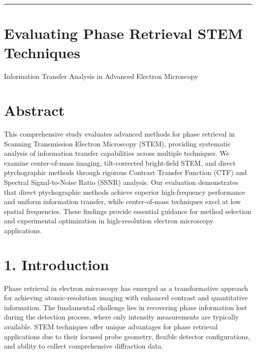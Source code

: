 \documentclass[
  letterpaper,
]{book}
\begin{document}
\begin{center}\rule{0.5\linewidth}{0.5pt}\end{center}


\chapter{Evaluating Phase Retrieval STEM
Techniques}\label{evaluating-phase-retrieval-stem-techniques}

Information Transfer Analysis in Advanced Electron Microscopy

\hfill\break

\label{abstract}

\chapter{Abstract}\label{abstract-1}

This comprehensive study evaluates advanced methods for phase retrieval
in Scanning Transmission Electron Microscopy (STEM), providing
systematic analysis of information transfer capabilities across multiple
techniques. We examine center-of-mass imaging, tilt-corrected
bright-field STEM, and direct ptychographic methods through rigorous
Contrast Transfer Function (CTF) and Spectral Signal-to-Noise Ratio
(SSNR) analysis. Our evaluation demonstrates that direct ptychographic
methods achieve superior high-frequency performance and uniform
information transfer, while center-of-mass techniques excel at low
spatial frequencies. These findings provide essential guidance for
method selection and experimental optimization in high-resolution
electron microscopy applications.


\chapter{1. Introduction}\label{introduction-1}

Phase retrieval in electron microscopy has emerged as a transformative
approach for achieving atomic-resolution imaging with enhanced contrast
and quantitative information. The fundamental challenge lies in
recovering phase information lost during the detection process, where
only intensity measurements are typically available. STEM techniques
offer unique advantages for phase retrieval applications due to their
focused probe geometry, flexible detector configurations, and ability to
collect comprehensive diffraction data.
\end{document}
